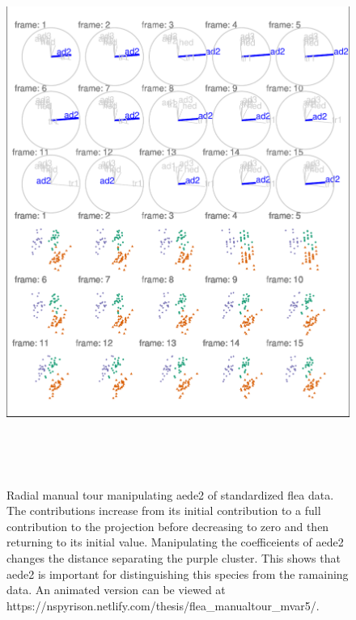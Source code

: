 \begin{Schunk}
\begin{figure}

{\centering \includegraphics[width=5.83in,height=7in]{spinifex_paper_files/figure-latex/step3-1} 

}

\caption[Radial manual tour manipulating aede2 of standardized flea data]{Radial manual tour manipulating aede2 of standardized flea data.  The contributions increase from its initial contribution to a full contribution to the projection before decreasing to zero and then returning to its initial value. Manipulating the coefficeients of aede2 changes the distance separating the purple cluster. This shows that aede2 is important for distinguishing this species from the ramaining data. An animated version can be viewed at  https://nspyrison.netlify.com/thesis/flea\_manualtour\_mvar5/.}\label{fig:step3}
\end{figure}
\end{Schunk}

